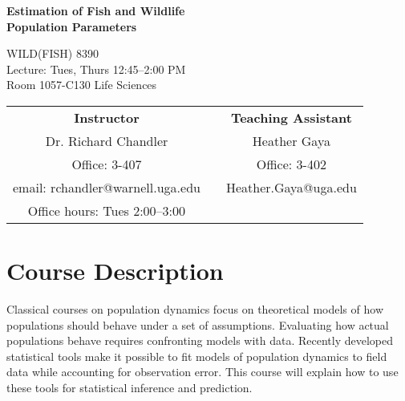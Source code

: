 \documentclass[12pt]{article}
\begin{document}

{\centering

{\Large \bf \sc
  Estimation of Fish and Wildlife \\ Population Parameters \\
}
\vspace{6pt}

WILD(FISH) 8390  \\
Lecture: Tues, Thurs 12:45--2:00 PM \\
Room 1057-C130 Life Sciences \\


\normalsize

\vspace{12pt}

\begin{tabular}[h!]{ccc}
\textbf{Instructor}                 & \hspace{0.01cm} & \textbf{Teaching Assistant} \\
Dr. Richard Chandler                & & Heather Gaya    \\
Office: 3-407                     & & Office: 3-402   \\
email: rchandler@warnell.uga.edu    & & Heather.Gaya@uga.edu \\
Office hours: Tues 2:00--3:00 & &  \\
\end{tabular}


}



\normalsize


\vspace{-4mm}
\section*{\normalsize Course Description}
\vspace{-4mm}
Classical courses on population dynamics focus on theoretical models 
of how populations should behave under a set of assumptions.
Evaluating how actual populations behave requires confronting models
with data. Recently developed statistical tools make it possible to fit
models of population dynamics to field data while accounting for
observation error. This course will explain how to use these tools for
statistical inference and prediction.  
\end{document}
